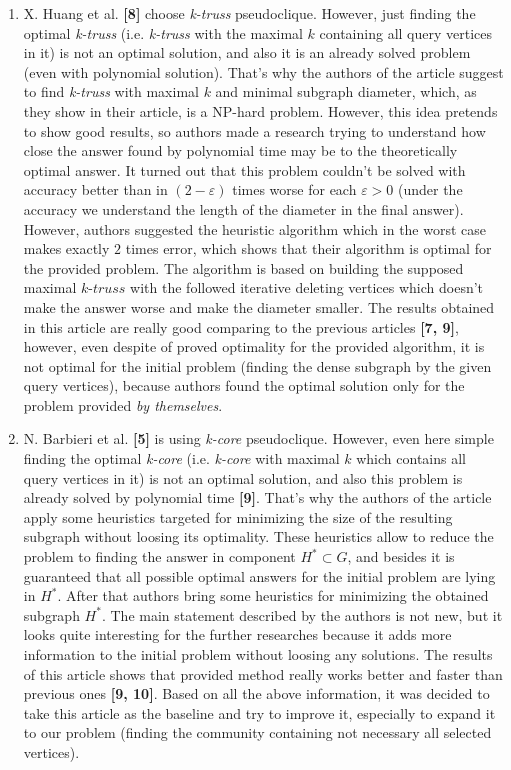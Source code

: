 \documentclass[11pt,a4paper,oneside]{article}
\begin{document}
\begin{enumerate}
  \item X. Huang et al. \textbf{[8]} choose \textit{k-truss} pseudoclique. However, just finding the optimal \textit{k-truss} (i.e. \textit{k-truss} with the maximal $k$ containing all query vertices in it) is not an optimal solution, and also it is an already solved problem (even with polynomial solution). That's why the authors of the article suggest to find \textit{k-truss} with maximal $k$ and minimal subgraph diameter, which, as they show in their article, is a NP-hard problem. However, this idea pretends to show good results, so authors made a research trying to understand how close the answer found by polynomial time may be to the theoretically optimal answer. It turned out that this problem couldn't be solved with accuracy better than in $(2 - \varepsilon)$ times worse for each $\varepsilon > 0$ (under the accuracy we understand the length of the diameter in the final answer). However, authors suggested the heuristic algorithm which in the worst case makes exactly $2$ times error, which shows that their algorithm is optimal for the provided problem. The algorithm is based on building the supposed maximal $\textit{k-truss}$ with the followed iterative deleting vertices which doesn't make the answer worse and make the diameter smaller. The results obtained in this article are really good comparing to the previous articles \textbf{[7, 9]}, however, even despite of proved optimality for the provided algorithm, it is not optimal for the initial problem (finding the dense subgraph by the given query vertices), because authors found the optimal solution only for the problem provided \textit{by themselves}.

  
  \item N. Barbieri et al. \textbf{[5]} is using \textit{k-core} pseudoclique. However, even here simple finding the optimal \textit{k-core} (i.e. \textit{k-core} with maximal $k$ which contains all query vertices in it) is not an optimal solution, and also this problem is already solved by polynomial time \textbf{[9]}. That's why the authors of the article apply some heuristics targeted for minimizing the size of the resulting subgraph without loosing its optimality. These heuristics allow to reduce the problem to finding the answer in component $H^* \subset G$, and besides it is guaranteed that all possible optimal answers for the initial problem are lying in $H^*$. After that authors bring some heuristics for minimizing the obtained subgraph $H^*$. The main statement described by the authors is not new, but it looks quite interesting for the further researches because it adds more information to the initial problem without loosing any solutions. The results of this article shows that provided method really works better and faster than previous ones \textbf{[9, 10]}. Based on all the above information, it was decided to take this article as the baseline and try to improve it, especially to expand it to our problem (finding the community containing not necessary all selected vertices).
\end{enumerate}
\end{document}
